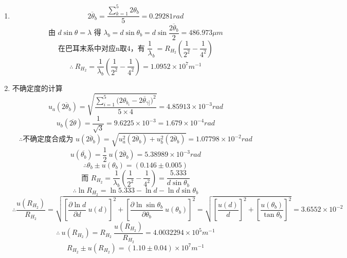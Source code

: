 \documentclass[11pt,a4paper,oneside]{article}
\begin{document}
\begin{enumerate}
  \item { }
      $$\overline{2{\theta}_b} = \displaystyle\frac{\sum_{k=1}^5 2{\theta}_b}{5} = 0.29281rad$$
      $$\displaystyle\text{由\ }d\sin{\theta} = {\lambda}\text{\ 得\ }{\lambda}_b = d\sin{\theta}_b = d\sin{\frac{\overline{2{\theta}_b}}{2}} = 486.973\mu m $$
      $$\displaystyle\text{在巴耳末系中对应n取4，有\ }\frac{1}{\lambda}_b = R_{H_2}\left(\frac{1}{2^2}-\frac{1}{4^2}\right)$$
      $$\therefore\ \displaystyle R_{H_2} = \frac{1}{ {\lambda}_b}\left(\frac{1}{2^2}-\frac{1}{4^2}\right) = 1.0952{\times}10^{7}m^{-1}$$
  \item {不确定度的计算}
      $$u_a(\overline{2{\theta}_b}) = \displaystyle\sqrt{\frac{\sum_{i=1}^5{(2{\theta}_{b_{i}}-\overline{2{\theta}_{\gamma]}}})^2}{5\times4}}=4.85913{\times}10^{-3}rad$$
      $$u_b(\overline{2\theta}) = \displaystyle\frac{1}{\sqrt3} = 9.6225\times10^{-3} = 1.679 \times 10^{-4} rad$$
      $$\therefore\text{不确定度合成为\ }u(\overline{2{\theta}_b}) = \sqrt{u_a^2(\overline{2{\theta}_b})+u_b^2(\overline{2{\theta}_b})} = 1.07798{\times}10^{-2}rad$$
      $$u(\overline{ {\theta}_b})= \displaystyle\frac12\ u(\overline{2{\theta}_b}) = 5.38989{\times}10^{-3}rad$$
      $$\therefore{\theta}_b \pm u({\theta}_b) = (0.146\pm0.005)$$
      $$\text{而\ }\displaystyle R_{H_2} = \frac{1}{ {\lambda}_b}\left(\frac{1}{2^2}-\frac{1}{4^2}\right) = \frac{5.333}{d\sin{\theta}_b}$$
      $$\therefore\ln{R_{H_2}} = \ln{5.333} -\ln{d} - \ln{d\sin{\theta}_b}$$
      $$\therefore\displaystyle \frac{u(R_{H_2})}{R_{H_2}} = \sqrt{ {\left[\frac{\partial{\ln{d}}}{\partial{d}}\ u(d)\right]}^2 + {\left[\frac{\partial{\ln{\sin{ {\theta}_b}}}}{\partial{ {\theta}_b}}\ u({\theta}_b)\right]}^2} = \sqrt{ {\left[\frac{u(d)}{d}\right]}^2 + {\left[\frac{u({\theta}_b)}{\tan{ {\theta}_b}}\right]}^2} = 3.6552{\times}10^{-2}$$
      $$\therefore \ u(R_{H_2}) = \displaystyle R_{H_2}\ \frac{u(R_{H_2})}{R_{H_2}} = 4.0032294{\times}10^{5}m^{-1}$$ 
      $$R_{H_2} \pm u(R_{H_2}) = (1.10\pm0.04){\times}10^{7}m^{-1}$$
\end{enumerate}
\end{document}
